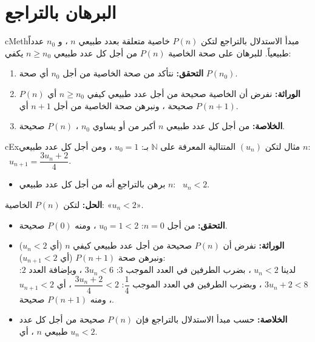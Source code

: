 \documentclass[12pt,a4paper]{article}
\newenvironment{BOX}[2]{\begin{otherlanguage}{english}\begin{arbox}{#1}{#2}}{\end{arbox}\end{otherlanguage}}
\newenvironment{mithal}[1][مثال]{\begin{BOX}{cEx}{#1}}{\end{BOX}}
\newenvironment{tariqa}[1][طريقة]{\begin{BOX}{cMeth}{#1}}{\end{BOX}}
\newenvironment{LTR}{\begin{otherlanguage}{english}}{\end{otherlanguage}}
\newcommand{\ar}[1]{\foreignlanguage{arabic}{#1}}
\newcommand{\N}{\mathbb{N}}
\begin{document}
\section{البرهان بالتراجع}
\begin{tariqa}[مبدأ الاستدلال بالتراجع]
لتكن $P(n)$ خاصية متعلقة بعدد طبيعي $n$ ، و $n_0$ عدداً طبيعياً.
للبرهان على صحة الخاصية $P(n)$ من أجل كل عدد طبيعي $n\ge n_0$ يكفي:
\begin{enumerate}
\item \textbf{التحقق:} نتأكد من صحة الخاصية من أجل $n_0$ أي صحة $P(n_0)$.
\item \textbf{الوراثة:} نفرض أن الخاصية صحيحة من أجل عدد طبيعي كيفي $n\ge n_0$ أي $P(n)$ صحيحة ، ونبرهن صحة الخاصية من أجل $n+1$ أي $P(n+1)$.
\item \textbf{الخلاصة:} من أجل كل عدد طبيعي $n$ أكبر من أو يساوي $n_0$ ، $P(n)$ صحيحة.
\end{enumerate}
\begin{center}
\begin{LTR}
\end{LTR}
\end{center}
\end{tariqa}

\begin{mithal}
لتكن $(u_n)$ المتتالية المعرفة على $\N$ بـ: $u_0=1$ ، ومن أجل كل عدد طبيعي $n$: \ $u_{n+1}=\dfrac{3u_n+2}{4}$.
\begin{itemize}
\item برهن بالتراجع أنه من أجل كل عدد طبيعي $n$: \ $u_n<2$.
\end{itemize}
\textbf{الحل:} لتكن $P(n)$ الخاصية: «$u_n<2$».
\begin{itemize}
\item \textbf{التحقق:} من أجل $n=0$: $u_0=1<2$ ، ومنه $P(0)$ صحيحة.
\item \textbf{الوراثة:} نفرض أن $P(n)$ صحيحة من أجل عدد طبيعي كيفي $n$ (أي $u_n<2$) ونبرهن صحة $P(n+1)$ (أي $u_{n+1}<2$):\\
لدينا $u_n<2$ ، بضرب الطرفين في العدد الموجب $3$: $3u_n<6$ ، وبإضافة العدد $2$: $3u_n+2<8$ ، وبضرب الطرفين في العدد الموجب $\dfrac14$: $\dfrac{3u_n+2}{4}<2$ ، أي $u_{n+1}<2$ ، ومنه $P(n+1)$ صحيحة.
\item \textbf{الخلاصة:} حسب مبدأ الاستدلال بالتراجع فإن $P(n)$ صحيحة من أجل كل عدد طبيعي $n$ ، أي $u_n<2$.
\end{itemize}
\end{mithal}
\end{document}
